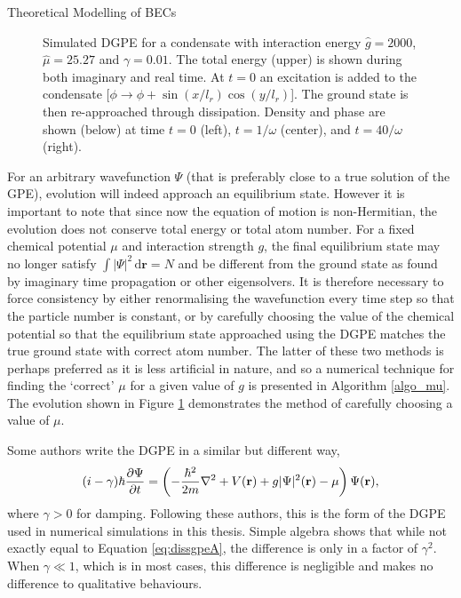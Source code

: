 \begin{chapter}{\label{cha:theoretical_model}Theoretical Modelling of BECs}
\begin{figure}[!ht]
	\caption{Simulated DGPE for a condensate with interaction energy $\hat{g}=2000$, $\hat{\mu}=25.27$ and $\gamma=0.01$. The total energy (upper) is shown during both imaginary and real time. At $t = 0$ an excitation is added to the condensate [$\phi\rightarrow \phi + \sin(x/l_r)\cos(y/l_r)$]. The ground state is then re-approached through dissipation. Density and phase are shown (below) at time $t=0$ (left), $t=1/\omega$ (center), and $t=40/\omega$ (right).}\label{fig_excitationdecay}
\end{figure}

	For an arbitrary wavefunction $\Psi$ (that is preferably close to a true solution of the GPE), evolution will indeed approach an equilibrium state. However it is important to note that since now the equation of motion is non-Hermitian, the evolution does not conserve total energy or total atom number. For a fixed chemical potential $\mu$ and interaction strength $g$, the final equilibrium state may no longer satisfy $\int\!|\Psi|^2\,\mathrm{d}\mathbf{r} = N$ and be different from the ground state as found by imaginary time propagation or other eigensolvers. It is therefore necessary to force consistency by either renormalising the wavefunction every time step so that the particle number is constant, or by carefully choosing the value of the chemical potential so that the equilibrium state approached using the DGPE matches the true ground state with correct atom number. The latter of these two methods is perhaps preferred as it is less artificial in nature, and so a numerical technique for finding the `correct' $\mu$ for a given value of $g$ is presented in Algorithm \ref{algo_mu}. The evolution shown in Figure \ref{fig_excitationdecay} demonstrates the method of carefully choosing a value of $\mu$.

	Some authors \cite{tsubota_kasamatsu_02,madarassy_barenghi_08} write the DGPE in a similar but different way,
	\begin{equation}\label{eq:dissgpeB}
		(i-\gamma)\hbar \frac{\partial \Psi}{\partial t} = \left( -\frac{\hbar^2 }{2m}\nabla^2 + V({\bf r}) + g|\Psi|^2({\bf r}) - \mu \right) \Psi({\bf r}),
	\end{equation}
	where $\gamma > 0$ for damping. Following these authors, this is the form of the DGPE used in numerical simulations in this thesis. Simple algebra shows that while not exactly equal to Equation \ref{eq:dissgpeA}, the difference is only in a factor of $\gamma^2$. When $\gamma \ll 1$, which is in most cases, this difference is negligible and makes no difference to qualitative behaviours.


\end{chapter}
